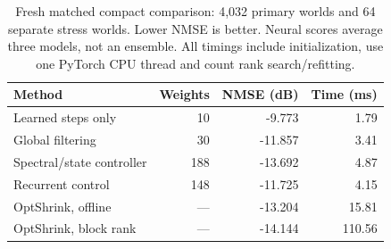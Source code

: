 \begin{table}[!t]
\caption{Fresh matched compact comparison: 4,032 primary worlds and 64 separate stress worlds. Lower NMSE is better. Neural scores average three models, not an ensemble. All timings include initialization, use one PyTorch CPU thread and count rank search/refitting.}
\label{tab:compact}\centering\footnotesize
\setlength{\tabcolsep}{3pt}
\begin{tabular}{@{}lrrr@{}}\toprule
Method & Weights & NMSE (dB) & Time (ms)\\
\midrule
Learned steps only & 10 & -9.773 & 1.79\\
Global filtering & 30 & -11.857 & 3.41\\
Spectral/state controller & 188 & -13.692 & 4.87\\
Recurrent control & 148 & -11.725 & 4.15\\
OptShrink, offline & --- & -13.204 & 15.81\\
OptShrink, block rank & --- & -14.144 & 110.56\\
\bottomrule
\end{tabular}
\end{table}
